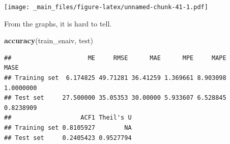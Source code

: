 \documentclass[]{book}
\newenvironment{Shaded}{\begin{snugshade}}{\end{snugshade}}
\newcommand{\DataTypeTok}[1]{\textcolor[rgb]{0.13,0.29,0.53}{#1}}
\newcommand{\DecValTok}[1]{\textcolor[rgb]{0.00,0.00,0.81}{#1}}
\newcommand{\KeywordTok}[1]{\textcolor[rgb]{0.13,0.29,0.53}{\textbf{#1}}}
\newcommand{\NormalTok}[1]{#1}
\newcommand{\OperatorTok}[1]{\textcolor[rgb]{0.81,0.36,0.00}{\textbf{#1}}}
\newcommand{\OtherTok}[1]{\textcolor[rgb]{0.56,0.35,0.01}{#1}}
\newcommand{\StringTok}[1]{\textcolor[rgb]{0.31,0.60,0.02}{#1}}
\begin{document}
\begin{Shaded}
\end{Shaded}

\texttt{[image: \_main\_files/figure-latex/unnamed-chunk-41-1.pdf]}

From the graphs, it is hard to tell.

\begin{Shaded}
\begin{Highlighting}[]
\KeywordTok{accuracy}\NormalTok{(train_snaiv, test)}
\end{Highlighting}
\end{Shaded}

\begin{verbatim}
##                     ME     RMSE      MAE      MPE     MAPE      MASE
## Training set  6.174825 49.71281 36.41259 1.369661 8.903098 1.0000000
## Test set     27.500000 35.05353 30.00000 5.933607 6.528845 0.8238909
##                   ACF1 Theil's U
## Training set 0.8105927        NA
## Test set     0.2405423 0.9527794
\end{verbatim}
\end{document}
